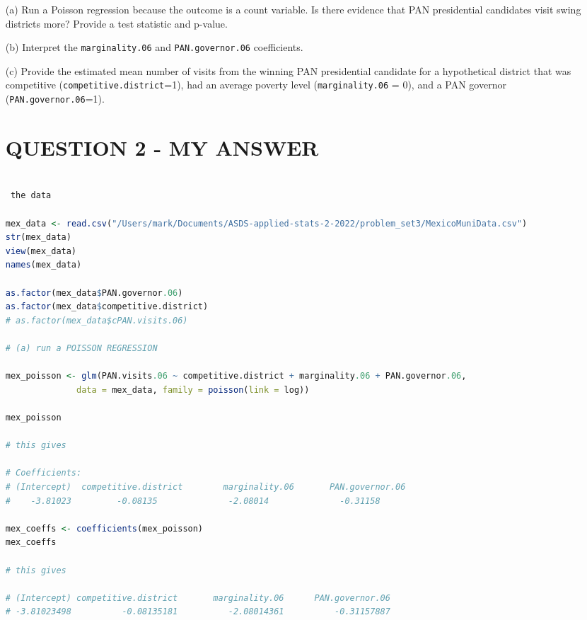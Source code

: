 \documentclass[12pt,letterpaper]{article}
\begin{document}
\begin{enumerate}
	\item [(a)]
	Run a Poisson regression because the outcome is a count variable. Is there evidence that PAN presidential candidates visit swing districts more? Provide a test statistic and p-value.

	\item [(b)]
	Interpret the \texttt{marginality.06} and \texttt{PAN.governor.06} coefficients.
	
	\item [(c)]
	Provide the estimated mean number of visits from the winning PAN presidential candidate for a hypothetical district that was competitive (\texttt{competitive.district}=1), had an average poverty level (\texttt{marginality.06} = 0), and a PAN governor (\texttt{PAN.governor.06}=1).
	
	
\section*{QUESTION 2 - MY ANSWER} 	

	\begin{lstlisting}[language=R]
	
 the data 

mex_data <- read.csv("/Users/mark/Documents/ASDS-applied-stats-2-2022/problem_set3/MexicoMuniData.csv")
str(mex_data)
view(mex_data)
names(mex_data)

as.factor(mex_data$PAN.governor.06)
as.factor(mex_data$competitive.district)
# as.factor(mex_data$cPAN.visits.06)

# (a) run a POISSON REGRESSION 

mex_poisson <- glm(PAN.visits.06 ~ competitive.district + marginality.06 + PAN.governor.06,
              data = mex_data, family = poisson(link = log))

mex_poisson

# this gives 

# Coefficients:
# (Intercept)  competitive.district        marginality.06       PAN.governor.06  
#    -3.81023         -0.08135              -2.08014              -0.31158 

mex_coeffs <- coefficients(mex_poisson)
mex_coeffs 

# this gives 

# (Intercept) competitive.district       marginality.06      PAN.governor.06 
# -3.81023498          -0.08135181          -2.08014361          -0.31157887 



	
	
	\end{lstlisting}

	
\end{enumerate}
\end{document}
